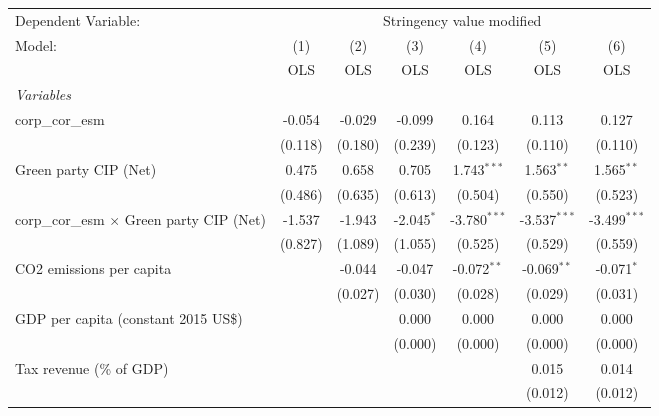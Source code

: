 
\begingroup
\centering
\begin{tabular}{lcccccc}
   \toprule
   Dependent Variable: & \multicolumn{6}{c}{Stringency value modified}\\
   Model:                                           & (1)     & (2)     & (3)          & (4)            & (5)            & (6)\\  
                                                    &  OLS    & OLS     & OLS          & OLS            & OLS            & OLS\\  
   \midrule
   \emph{Variables}\\
   corp\_cor\_esm                                   & -0.054  & -0.029  & -0.099       & 0.164          & 0.113          & 0.127\\   
                                                    & (0.118) & (0.180) & (0.239)      & (0.123)        & (0.110)        & (0.110)\\   
   Green party CIP (Net)                            & 0.475   & 0.658   & 0.705        & 1.743$^{***}$  & 1.563$^{**}$   & 1.565$^{**}$\\   
                                                    & (0.486) & (0.635) & (0.613)      & (0.504)        & (0.550)        & (0.523)\\   
   corp\_cor\_esm $\times$ Green party CIP (Net)    & -1.537  & -1.943  & -2.045$^{*}$ & -3.780$^{***}$ & -3.537$^{***}$ & -3.499$^{***}$\\   
                                                    & (0.827) & (1.089) & (1.055)      & (0.525)        & (0.529)        & (0.559)\\   
   CO2 emissions per capita                         &         & -0.044  & -0.047       & -0.072$^{**}$  & -0.069$^{**}$  & -0.071$^{*}$\\   
                                                    &         & (0.027) & (0.030)      & (0.028)        & (0.029)        & (0.031)\\   
   GDP per capita (constant 2015 US\$)              &         &         & 0.000        & 0.000          & 0.000          & 0.000\\   
                                                    &         &         & (0.000)      & (0.000)        & (0.000)        & (0.000)\\   
   Tax revenue (\% of GDP)                          &         &         &              &                & 0.015          & 0.014\\   
                                                    &         &         &              &                & (0.012)        & (0.012)\\   

\end{tabular}
